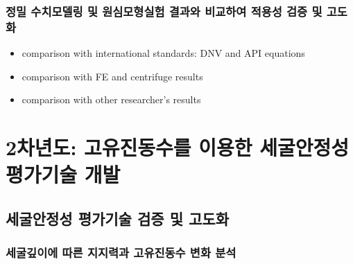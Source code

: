 \documentclass[
  letterpaper,
  DIV=11,
  numbers=noendperiod]{scrreprt}
\providecommand{\tightlist}{%
  \setlength{\itemsep}{0pt}\setlength{\parskip}{0pt}}\usepackage{longtable,booktabs,array}
\begin{document}
\hypertarget{uxc815uxbc00-uxc218uxce58uxbaa8uxb378uxb9c1-uxbc0f-uxc6d0uxc2ecuxbaa8uxd615uxc2e4uxd5d8-uxacb0uxacfcuxc640-uxbe44uxad50uxd558uxc5ec-uxc801uxc6a9uxc131-uxac80uxc99d-uxbc0f-uxace0uxb3c4uxd654}{%
\subsubsection{정밀 수치모델링 및 원심모형실험 결과와 비교하여 적용성
검증 및
고도화}\label{uxc815uxbc00-uxc218uxce58uxbaa8uxb378uxb9c1-uxbc0f-uxc6d0uxc2ecuxbaa8uxd615uxc2e4uxd5d8-uxacb0uxacfcuxc640-uxbe44uxad50uxd558uxc5ec-uxc801uxc6a9uxc131-uxac80uxc99d-uxbc0f-uxace0uxb3c4uxd654}}

\begin{itemize}
\tightlist
\item
  comparison with international standards: DNV and API equations
\item
  comparison with FE and centrifuge results
\item
  comparison with other researcher's results
\end{itemize}

\hypertarget{uxcc28uxb144uxb3c4-uxace0uxc720uxc9c4uxb3d9uxc218uxb97c-uxc774uxc6a9uxd55c-uxc138uxad74uxc548uxc815uxc131-uxd3c9uxac00uxae30uxc220-uxac1cuxbc1c}{%
\section{\texorpdfstring{\textbf{2차년도:} 고유진동수를 이용한
세굴안정성 평가기술
개발}{2차년도: 고유진동수를 이용한 세굴안정성 평가기술 개발}}\label{uxcc28uxb144uxb3c4-uxace0uxc720uxc9c4uxb3d9uxc218uxb97c-uxc774uxc6a9uxd55c-uxc138uxad74uxc548uxc815uxc131-uxd3c9uxac00uxae30uxc220-uxac1cuxbc1c}}

\hypertarget{uxc138uxad74uxc548uxc815uxc131-uxd3c9uxac00uxae30uxc220-uxac80uxc99d-uxbc0f-uxace0uxb3c4uxd654}{%
\subsection{세굴안정성 평가기술 검증 및
고도화}\label{uxc138uxad74uxc548uxc815uxc131-uxd3c9uxac00uxae30uxc220-uxac80uxc99d-uxbc0f-uxace0uxb3c4uxd654}}

\hypertarget{uxc138uxad74uxae4auxc774uxc5d0-uxb530uxb978-uxc9c0uxc9c0uxb825uxacfc-uxace0uxc720uxc9c4uxb3d9uxc218-uxbcc0uxd654-uxbd84uxc11d}{%
\subsubsection{세굴깊이에 따른 지지력과 고유진동수 변화
분석}\label{uxc138uxad74uxae4auxc774uxc5d0-uxb530uxb978-uxc9c0uxc9c0uxb825uxacfc-uxace0uxc720uxc9c4uxb3d9uxc218-uxbcc0uxd654-uxbd84uxc11d}}
\end{document}
